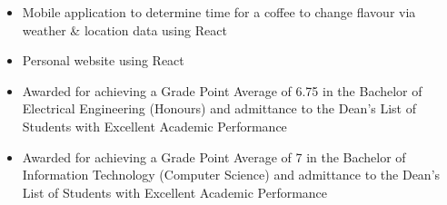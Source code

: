 
	

	\begin{itemize}
		\item Mobile application to determine time for a coffee to change flavour via weather \& location data using React		
		\item Personal website using React
	\end{itemize}

	\begin{itemize}
		\item  Awarded for achieving a Grade Point Average of 6.75 in the Bachelor of Electrical Engineering
 (Honours) and admittance to the Dean's List of Students with Excellent Academic
 Performance
	\end{itemize}
	\begin{itemize}
		\item  Awarded for achieving a Grade Point Average of 7 in the Bachelor of Information Technology
 (Computer Science) and admittance to the Dean's List of Students with Excellent Academic
 Performance
	\end{itemize}

